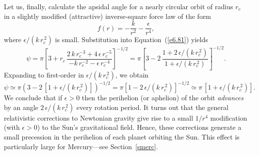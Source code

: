 Let us, finally, calculate the apsidal angle for a nearly circular orbit of radius $r_c$ in a slightly modified (attractive) inverse-square force law of the
form
\begin{equation}
f(r) = - \frac{k}{r^2} - \frac{\epsilon}{r^4},
\end{equation}
where $\epsilon/(k\,r_c^{\,2})$ is small. Substitution into Equation~(\ref{e6.81}) yields
\begin{equation}
\psi = \pi\left[3 + r_c\,\frac{2\,k\,r_c^{-3} + 4\,\epsilon\,r_c^{-5}}{-k\,r_c^{-2} -\epsilon\,r_c^{-4}}\right]^{-1/2} = \pi\left[3- 2\,\frac{1 + 2\,\epsilon/(k\,r_c^{\,2})}{1+\epsilon/(k\,r_c^{\,2})}\right]^{-1/2}.
\end{equation}
Expanding to first-order in $\epsilon/(k\,r_c^{\,2})$, we obtain
\begin{equation}
\psi\simeq \pi\left(3-2\,[1+\epsilon/(k\,r_c^{\,2})]\right)^{-1/2}=
\pi\left[1-2\,\epsilon/(k\,r_c^{\,2})\right]^{-1/2} \simeq
\pi\,[1+\epsilon/(k\,r_c^{\,2})].
\end{equation}
We conclude that if $\epsilon>0$ then the perihelion (or aphelion) of the orbit {\em advances}\/ by an angle $2\,\epsilon/(k\,r_c^{\,2})$ every rotation period.
It turns out that the general relativistic corrections to
Newtonian gravity give rise to a small $1/r^4$ modification (with $\epsilon>0$) to
the Sun's gravitational field. Hence, these corrections generate
a small precession in the perihelion of each planet orbiting the Sun. This
effect is particularly large for Mercury---see Section~\ref{smerc}.

